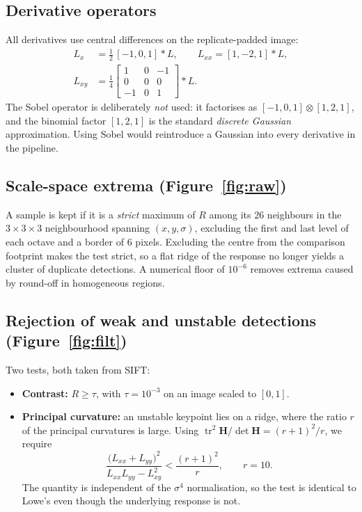 \documentclass[11pt,a4paper]{article}
\begin{document}
\subsection{Derivative operators}

All derivatives use central differences on the replicate-padded image:
\begin{align}
L_x &= \tfrac12\,[-1,0,1]*L,
\qquad L_{xx} = [1,-2,1]*L, \\[2pt]
L_{xy} &= \tfrac14
\begin{bmatrix}1&0&-1\\ 0&0&0\\ -1&0&1\end{bmatrix}*L .
\end{align}
The Sobel operator is deliberately \emph{not} used: it factorises as
$[-1,0,1]\otimes[1,2,1]$, and the binomial factor $[1,2,1]$ is the standard
\emph{discrete Gaussian} approximation. Using Sobel would reintroduce a
Gaussian into every derivative in the pipeline.

\subsection{Scale-space extrema (Figure~\ref{fig:raw})}

A sample is kept if it is a \emph{strict} maximum of $R$ among its $26$
neighbours in the $3\times3\times3$ neighbourhood spanning $(x,y,\sigma)$,
excluding the first and last level of each octave and a border of $6$ pixels.
Excluding the centre from the comparison footprint makes the test strict, so a
flat ridge of the response no longer yields a cluster of duplicate detections.
A numerical floor of $10^{-6}$ removes extrema caused by round-off in
homogeneous regions.

\subsection{Rejection of weak and unstable detections (Figure~\ref{fig:filt})}

Two tests, both taken from SIFT:
\begin{itemize}\itemsep2pt
\item \textbf{Contrast:} $R\ge\tau$, with $\tau=10^{-3}$ on an image scaled to
$[0,1]$.
\item \textbf{Principal curvature:} an unstable keypoint lies on a ridge, where
the ratio $r$ of the principal curvatures is large. Using
$\operatorname{tr}^2\mathbf{H}/\det\mathbf{H}=(r+1)^2/r$, we require
\begin{equation}
\frac{\bigl(L_{xx}+L_{yy}\bigr)^{2}}{L_{xx}L_{yy}-L_{xy}^{2}}
<\frac{(r+1)^{2}}{r},\qquad r=10 .
\end{equation}
The quantity is independent of the $\sigma^4$ normalisation, so the test is
identical to Lowe's even though the underlying response is not.
\end{itemize}
\end{document}
